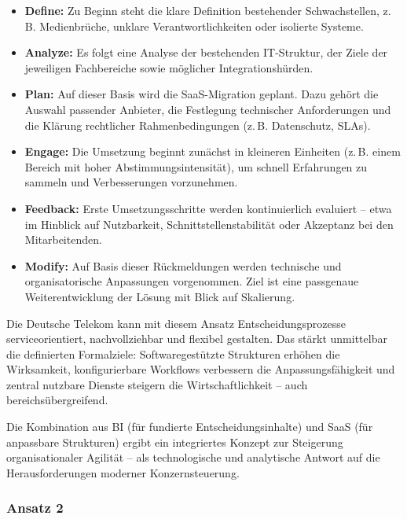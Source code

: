 \documentclass[12pt,a4paper]{article}
\begin{document}
\begin{itemize}
	\item \textbf{Define:} Zu Beginn steht die klare Definition bestehender Schwachstellen, z.\,B. Medienbrüche, unklare Verantwortlichkeiten oder isolierte Systeme.
	\item \textbf{Analyze:} Es folgt eine Analyse der bestehenden IT-Struktur, der Ziele der jeweiligen Fachbereiche sowie möglicher Integrationshürden.
	
	\item \textbf{Plan:} Auf dieser Basis wird die SaaS-Migration geplant. Dazu gehört die Auswahl passender Anbieter, die Festlegung technischer Anforderungen und die Klärung rechtlicher Rahmenbedingungen (z.\,B. Datenschutz, SLAs).
	
	\item \textbf{Engage:} Die Umsetzung beginnt zunächst in kleineren Einheiten (z.\,B. einem Bereich mit hoher Abstimmungsintensität), um schnell Erfahrungen zu sammeln und Verbesserungen vorzunehmen.
	
	\item \textbf{Feedback:} Erste Umsetzungsschritte werden kontinuierlich evaluiert – etwa im Hinblick auf Nutzbarkeit, Schnittstellenstabilität oder Akzeptanz bei den Mitarbeitenden.
	
	\item \textbf{Modify:} Auf Basis dieser Rückmeldungen werden technische und organisatorische Anpassungen vorgenommen. Ziel ist eine passgenaue Weiterentwicklung der Lösung mit Blick auf Skalierung.
\end{itemize}

\noindent Die Deutsche Telekom kann mit diesem Ansatz Entscheidungsprozesse serviceorientiert, nachvollziehbar und flexibel gestalten. Das stärkt unmittelbar die definierten Formalziele: Softwaregestützte Strukturen erhöhen die Wirksamkeit, konfigurierbare Workflows verbessern die Anpassungsfähigkeit und zentral nutzbare Dienste steigern die Wirtschaftlichkeit – auch bereichsübergreifend.

\noindent Die Kombination aus BI (für fundierte Entscheidungsinhalte) und SaaS (für anpassbare Strukturen) ergibt ein integriertes Konzept zur Steigerung organisationaler Agilität – als technologische und analytische Antwort auf die Herausforderungen moderner Konzernsteuerung.

\subsubsection{Ansatz 2}
\end{document}
